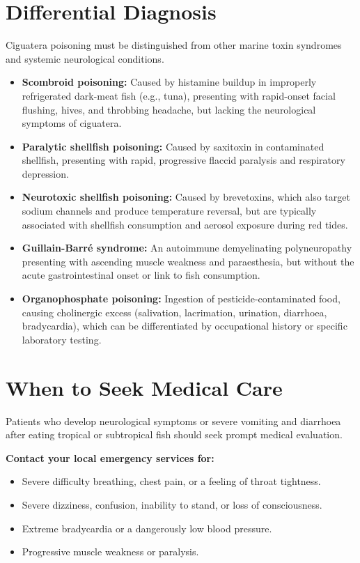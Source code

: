 \section*{Differential Diagnosis}
Ciguatera poisoning must be distinguished from other marine toxin syndromes and systemic neurological conditions.
\begin{itemize}
    \item \textbf{Scombroid poisoning:} Caused by histamine buildup in improperly refrigerated dark-meat fish (e.g., tuna), presenting with rapid-onset facial flushing, hives, and throbbing headache, but lacking the neurological symptoms of ciguatera.
    \item \textbf{Paralytic shellfish poisoning:} Caused by saxitoxin in contaminated shellfish, presenting with rapid, progressive flaccid paralysis and respiratory depression.
    \item \textbf{Neurotoxic shellfish poisoning:} Caused by brevetoxins, which also target sodium channels and produce temperature reversal, but are typically associated with shellfish consumption and aerosol exposure during red tides.
    \item \textbf{Guillain-Barr\'{e} syndrome:} An autoimmune demyelinating polyneuropathy presenting with ascending muscle weakness and paraesthesia, but without the acute gastrointestinal onset or link to fish consumption.
    \item \textbf{Organophosphate poisoning:} Ingestion of pesticide-contaminated food, causing cholinergic excess (salivation, lacrimation, urination, diarrhoea, bradycardia), which can be differentiated by occupational history or specific laboratory testing.
\end{itemize}

\section*{When to Seek Medical Care}
Patients who develop neurological symptoms or severe vomiting and diarrhoea after eating tropical or subtropical fish should seek prompt medical evaluation.

\textbf{Contact your local emergency services for:}
\begin{itemize}
    \item Severe difficulty breathing, chest pain, or a feeling of throat tightness.
    \item Severe dizziness, confusion, inability to stand, or loss of consciousness.
    \item Extreme bradycardia or a dangerously low blood pressure.
    \item Progressive muscle weakness or paralysis.
\end{itemize}

